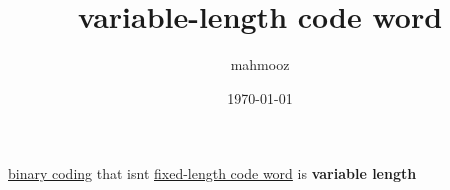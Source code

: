 \documentclass[11pt]{article}
\author{mahmooz}
\date{\today}
\title{variable-length code word}
\begin{document}
\maketitle
\tableofcontents

\href{20230119160930-binary_coding.org}{binary coding} that isnt \href{20230119170007-fixed_length_code_word.org}{fixed-length code word} is \textbf{variable length}
\end{document}
